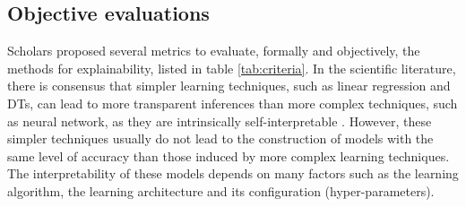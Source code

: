 \documentclass[final,1p,times]{elsarticle}
\begin{document}
\subsection{Objective evaluations}\label{formal_evaluation}
Scholars proposed several metrics to evaluate, formally and objectively, the methods for explainability, listed in table \ref{tab:criteria}. In the scientific literature, there is consensus that simpler learning techniques, such as linear regression and DTs, can lead to more transparent inferences than more complex techniques, such as neural network, as they are intrinsically self-interpretable \cite{dam2018explainable}.
However, these simpler techniques usually do not lead to the construction of models with the same level of accuracy than those induced by more complex learning techniques. The interpretability of these models depends on many factors such as the learning algorithm, the learning architecture and its configuration (hyper-parameters).\\
\end{document}
